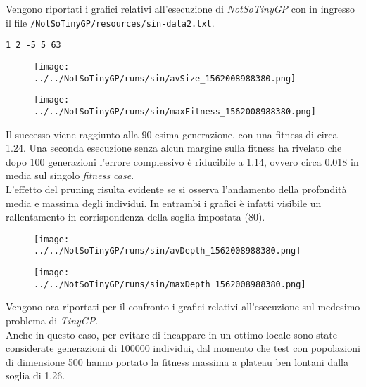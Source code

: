 \documentclass{../llncs}
\newcommand{\labelfig}[1]{\label{fig:#1}}
\begin{document}
\indent Vengono riportati i grafici relativi all'esecuzione di \emph{NotSoTinyGP} con in ingresso il file \texttt{/NotSoTinyGP/resources/sin-data2.txt}.
\begin{lstlisting}[caption={Prima riga di \texttt{/NotSoTinyGP/resources/sin-data2.txt}}]
1 2 -5 5 63
\end{lstlisting}

\begin{figure}[!htb]
\centering
\texttt{[image: ../../NotSoTinyGP/runs/sin/avSize\_1562008988380.png]}
\end{figure}

\begin{figure}[!htb]
\centering
\texttt{[image: ../../NotSoTinyGP/runs/sin/maxFitness\_1562008988380.png]}
\end{figure}

Il successo viene raggiunto alla 90-esima generazione, con una fitness di circa 1.24. Una seconda esecuzione senza alcun margine sulla fitness ha rivelato che dopo 100 generazioni l'errore complessivo è riducibile a 1.14, ovvero circa 0.018 in media sul singolo \emph{fitness case}.\\

L'effetto del pruning risulta evidente se si osserva l'andamento della profondità media e massima degli individui. In entrambi i grafici è infatti visibile un rallentamento in corrispondenza della soglia impostata (80).\\

\begin{figure}[!htb]
\centering
\texttt{[image: ../../NotSoTinyGP/runs/sin/avDepth\_1562008988380.png]}
\end{figure}

\begin{figure}[!htb]
\centering
\texttt{[image: ../../NotSoTinyGP/runs/sin/maxDepth\_1562008988380.png]}
\end{figure}

Vengono ora riportati per il confronto i grafici relativi all'esecuzione sul medesimo problema di \emph{TinyGP}.\\

Anche in questo caso, per evitare di incappare in un ottimo locale sono state considerate generazioni di 100000 individui, dal momento che test con popolazioni di dimensione 500 hanno portato la fitness massima a plateau ben lontani dalla soglia di 1.26.
\end{document}
